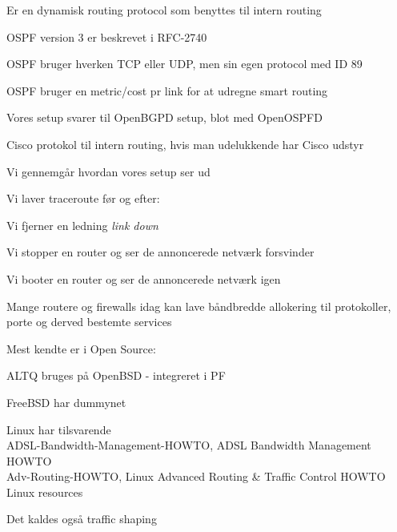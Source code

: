 

\begin{list1}
\item Er en dynamisk routing protocol som benyttes til intern routing
\item OSPF version 3 er beskrevet i RFC-2740
\item OSPF bruger hverken TCP eller UDP, men sin egen protocol med ID 89
\item OSPF bruger en metric/cost pr link for at udregne smart routing 
\item {}
\item Vores setup svarer til OpenBGPD setup, blot med OpenOSPFD
\end{list1}



\begin{list1}
\item Cisco protokol til intern routing, hvis man udelukkende har Cisco udstyr
\item {}
\end{list1}


\begin{list1}
\item Vi gennemgår hvordan vores setup ser ud
\item Vi laver traceroute før og efter:
\item Vi fjerner en ledning \emph{link down}
\item Vi stopper en router og ser de annoncerede netværk forsvinder
\item Vi booter en router og ser de annoncerede netværk igen
\end{list1}


\begin{list1}
\item Mange routere og firewalls idag kan lave båndbredde allokering til
  protokoller, porte og derved bestemte services
\item Mest kendte er i Open Source:
\begin{list2}
\item ALTQ bruges på OpenBSD - integreret i PF
\item FreeBSD har dummynet
\item Linux har tilsvarende\\
ADSL-Bandwidth-Management-HOWTO, ADSL Bandwidth Management HOWTO\\
Adv-Routing-HOWTO, Linux Advanced Routing \& Traffic Control HOWTO\\
 Linux resources
\end{list2}
\item Det kaldes også traffic shaping
\end{list1}



